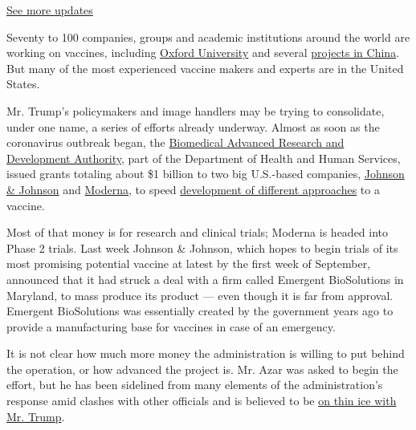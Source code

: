\href{https://www.nytimes3xbfgragh.onion/2020/07/31/us/elections/biden-vs-trump.html?action=click\&pgtype=Article\&state=default\&region=MAIN_CONTENT_1\&context=storylines_live_updates}{See
more updates}

Seventy to 100 companies, groups and academic institutions around the
world are working on vaccines, including
\href{https://www.nytimes3xbfgragh.onion/2020/04/27/world/europe/coronavirus-vaccine-update-oxford.html}{Oxford
University} and several
\href{https://www.nytimes3xbfgragh.onion/2020/04/10/business/coronavirus-vaccine-nationalism.html}{projects
in China}. But many of the most experienced vaccine makers and experts
are in the United States.

Mr. Trump's policymakers and image handlers may be trying to
consolidate, under one name, a series of efforts already underway.
Almost as soon as the coronavirus outbreak began, the
\href{https://www.phe.gov/about/barda/Pages/default.aspx}{Biomedical
Advanced Research and Development Authority}, part of the Department of
Health and Human Services, issued grants totaling about \$1 billion to
two big U.S.-based companies,
\href{https://www.nytimes3xbfgragh.onion/2020/05/19/business/johnson-baby-powder-sales-stopped.html}{Johnson
\& Johnson} and
\href{https://www.nytimes3xbfgragh.onion/2020/03/16/health/coronavirus-vaccine.html}{Moderna},
to speed
\href{https://www.nytimes3xbfgragh.onion/2020/04/08/health/coronavirus-vaccines.html}{development
of different approaches} to a vaccine.

Most of that money is for research and clinical trials; Moderna is
headed into Phase 2 trials. Last week Johnson \& Johnson, which hopes to
begin trials of its most promising potential vaccine at latest by the
first week of September, announced that it had struck a deal with a firm
called Emergent BioSolutions in Maryland, to mass produce its product
--- even though it is far from approval. Emergent BioSolutions was
essentially created by the government years ago to provide a
manufacturing base for vaccines in case of an emergency.

It is not clear how much more money the administration is willing to put
behind the operation, or how advanced the project is. Mr. Azar was asked
to begin the effort, but he has been sidelined from many elements of the
administration's response amid clashes with other officials and is
believed to be
\href{https://www.nytimes3xbfgragh.onion/2020/04/29/us/politics/coronavirus-trump-azar.html}{on
thin ice with Mr. Trump}.

